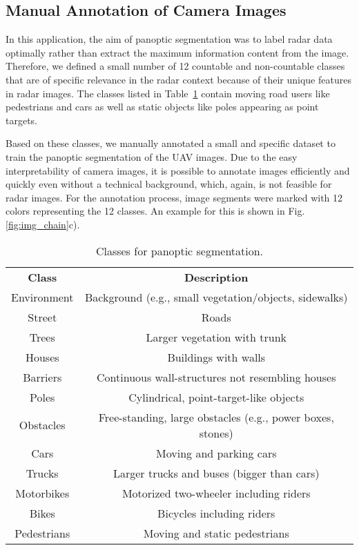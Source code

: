 \documentclass[conference]{IEEEtran}
\begin{document}
%
\subsection{Manual Annotation of Camera Images}

In this application, the aim of panoptic segmentation was to label radar data optimally rather than extract the maximum information content from the image.
Therefore, we defined a small number of 12 countable and non-countable classes that are of specific relevance in the radar context because of their unique features in radar images.
The classes listed in Table~\ref{tab:classes} contain moving road users like pedestrians and cars as well as static objects like poles appearing as point targets.

Based on these classes, we manually annotated a small and specific dataset to train the panoptic segmentation of the UAV images. 
Due to the easy interpretability of camera images, it is possible to annotate images efficiently and quickly even without a technical background, which, again, is not feasible for radar images.
For the annotation process, image segments were marked with 12 colors representing the 12 classes.
An example for this is shown in Fig. \ref{fig:img_chain}c).

\begin{table}[tb]
\centering
\caption{Classes for panoptic segmentation.}
    \begin{subtable}{\linewidth}  
    \centering  
        \begin{tabular}{c|c}
        
        \hline
        \textbf{Class} & \textbf{Description} \\
        \Xhline{4\arrayrulewidth}
        Environment & Background (e.g., small vegetation/objects, sidewalks) \\
        \hline
        Street & Roads \\
        \hline
        Trees & Larger vegetation with trunk  \\
        \hline 
        Houses & Buildings with walls  \\
        \hline
        Barriers & Continuous wall-structures not resembling houses\\
        \hline
        Poles & Cylindrical, point-target-like objects \\
        \hline
        Obstacles & Free-standing, large obstacles (e.g., power boxes, stones) \\
        \hline
        Cars & Moving and parking cars \\
        \hline
        Trucks & Larger trucks and buses (bigger than cars) \\
        \hline
        Motorbikes & Motorized two-wheeler including riders \\
        \hline
        Bikes & Bicycles including riders \\
        \hline
        Pedestrians & Moving and static pedestrians\\
        \end{tabular}
    \end{subtable}
\label{tab:classes}

\end{table}
\end{document}
